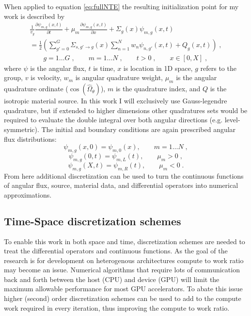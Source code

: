 When applied to equation \ref{eq:fullNTE} the resulting initialization point for my work is described by
\begin{multline}
    \label{eq:sn_nte}
    \frac{1}{v_g} \frac{\partial \psi_{m,g}(x,t)}{\partial t} + \mu_m \frac{\partial \psi_{m,g}(x,t)}{\partial x} + \Sigma_g(x) \psi_{m,g}(x,t)  \\
     = \frac{1}{2} \left( \sum\limits_{g' = 0}^G \Sigma_{s, g'\to g}(x) \sum\limits_{n=1}^N w_n \psi_{n, g'}(x,t) + Q_g(x,t) \right) \;, \\
    \qquad g=1 \ldots G \;, \qquad m=1 \ldots N \;, \qquad t > 0 \;, \qquad x \in [0,X] \;,
\end{multline}
where $\psi$ is the angular flux, $t$ is time, $x$ is location in 1D space, $g$ refers to the group, $v$ is velocity, $w_m$ is angular quadrature weight, $\mu_m$ is the angular quadrature ordinate ($\cos(\hat{\Omega}_\theta)$), $m$ is the quadrature index, and $Q$ is the isotropic material source.
In this work I will exclusively use Gauss-legendre quadrature, but if extended to higher dimensions other quadratures sets would be required to evaluate the double integral over both angular directions (e.g. level-symmetric). 
The initial and boundary conditions are again prescribed angular flux distributions:
\begin{equation*}
    \psi_{m,g}(x,0) = \psi_{m,0}(x), \qquad m=1 \ldots N \;,
\end{equation*}
\begin{equation*}
    \psi_{m,g}(0,t) = \psi_{m,L}(t), \qquad \mu_m >0 \;,
\end{equation*}
\begin{equation*}
    \psi_{m,g}(X,t) = \psi_{m,R}(t), \qquad \mu_m <0 \;.
\end{equation*}
From here additional discretization can be used to turn the continuous functions of angular flux, source, material data, and differential operators into numerical approximations.

\subsection{Time-Space discretization schemes}

To enable this work in both space and time, discretization schemes are needed to treat the differential operators and continuous functions.
As the goal of the research is for development on heterogenous architectures compute to work ratio may become an issue.
Numerical algorithms that require lots of communication back and forth between the host (CPU) and device (GPU) will limit the maximum allowable performance for most GPU accelerators.
To abate this issue higher (second) order discretization schemes can be used to add to the compute work required in every iteration, thus improving the compute to work ratio.

